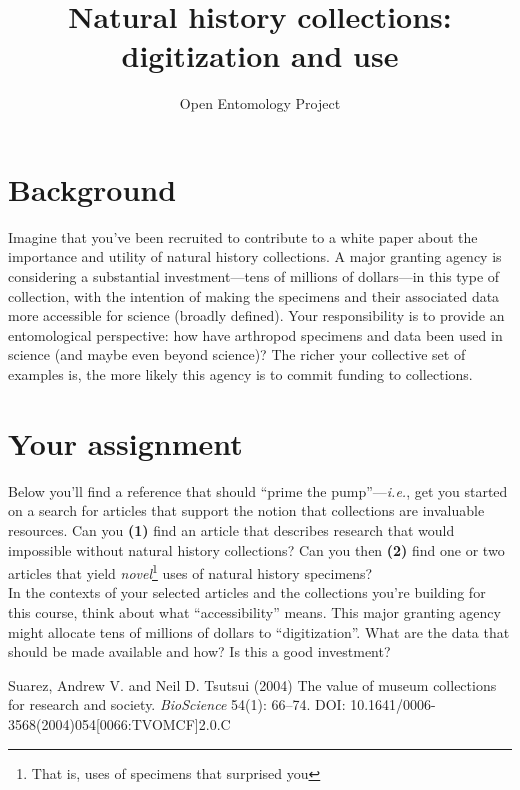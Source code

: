 \documentclass[letterpaper, 11pt]{article}
\title{Natural history collections: digitization and use}
\author{Open Entomology Project}
\begin{document}
\cleanlookdateon %
\maketitle
\thispagestyle{fancy}
\section*{Background}
Imagine that you've been recruited to contribute to a white paper about the importance and utility of natural history collections. A major granting agency is considering a substantial investment---tens of millions of dollars---in this type of collection, with the intention of making the specimens and their associated data more accessible for science (broadly defined). Your responsibility is to provide an entomological perspective: how have arthropod specimens and data been used in science (and maybe even beyond science)? The richer your collective set of examples is, the more likely this agency is to commit funding to collections. 

\section*{Your assignment}
Below you'll find a reference \cite{suarez2004} that should ``prime the pump''---\textit{i.e.}, get you started on a search for articles that support the notion that collections are invaluable resources. Can you \textbf{(1)} find an article that describes research that would impossible without natural history collections? Can you then \textbf{(2)} find one or two articles that yield \textit{novel}\footnote{That is, uses of specimens that surprised you} uses of natural history specimens?\\

In the contexts of your selected articles and the collections you're building for this course, think about what ``accessibility'' means. This major granting agency might allocate tens of millions of dollars to ``digitization''. What are the data that should be made available and how? Is this a good investment?\vspace{2.5cm}



\begin{thebibliography}{9}
 Suarez, Andrew V. and Neil D. Tsutsui (2004) The value of museum collections for research and society. \textit{BioScience} 54(1): 66--74. DOI: 10.1641/0006-3568(2004)054[0066:TVOMCF]2.0.C
\end{thebibliography}
\end{document}
